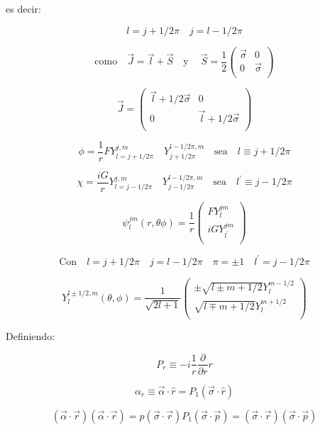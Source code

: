 \documentclass{report}
\begin{document}
es decir:

\[l = j + 1/2 \pi \quad j = l -1/2 \pi\]

\[\text{como} \quad \overrightarrow{J} = \overrightarrow{l} + \overrightarrow{S} \quad  \text{y} \ \quad \overrightarrow{S} = \frac{1}{2} \left ( \begin{array}{cc}
 \overrightarrow{\sigma} & 0 \\
 0 & \overrightarrow{\sigma} \\
 \end{array} \right) \]

\[\overrightarrow{J} = \left ( \begin{array}{cc}
 \overrightarrow{l}+1/2 \overrightarrow{\sigma} & 0 \\
 0 & \overrightarrow{l}+1/2 \overrightarrow{\sigma} \\
 \end{array} \right)\]

\[\phi = \frac{1}{r} F Y_{l=j+1/2 \pi}^{j,m} \quad Y_{j+1/2\pi}^{l-1/2\pi,m} \quad \text{sea} \quad l \equiv j+1/2 \pi\]

\[\chi = \frac{iG}{r}  Y_{l=j-1/2 \pi}^{j,m} \quad Y_{j-1/2\pi}^{l-1/2\pi,m} \quad \text{sea} \quad l^{\prime} \equiv j-1/2 \pi\]

\[\psi _{l}^{jm}(r,\theta \phi) = \frac{1}{r} \left ( \begin{array}{cc}
 F Y_{l}^{jm}  \\
 iG Y_{l^{\prime}}^{jm}   \\
 \end{array} \right)\]

\[\text{Con} \quad l = j + 1/2 \pi \quad j = l -1/2 \pi \quad \pi = \pm 1 \quad l^{\prime} = j-1/2 \pi\]

\[Y_{l}^{l \pm 1/2,m}(\theta , \phi) = \frac{1}{\sqrt{2l+1}} \left ( \begin{array}{cc}
 \pm \sqrt{l \pm m + 1/2} Y_{l}^{m-1/2}  \\
 \sqrt{l \mp m + 1/2} Y_{l}^{m+1/2}   \\
 \end{array} \right) \]

Definiendo:

\[P_{r} \equiv - i \frac{1}{r} \frac{\partial}{\partial r} r\]

\begin{equation}
\alpha_r \equiv \overrightarrow{\alpha} \cdot \hat{r} = P_1 (\overrightarrow{\sigma} \cdot \hat{r})
\end{equation}

\[(\overrightarrow{\alpha} \cdot \overrightarrow{r}) (\overrightarrow{\alpha} \cdot \overrightarrow{r}) = p (\overrightarrow{\sigma} \cdot \overrightarrow{r})P_1 (\overrightarrow{\sigma} \cdot \overrightarrow{p}) = (\overrightarrow{\sigma} \cdot \overrightarrow{r}) (\overrightarrow{\sigma} \cdot \overrightarrow{p})\]
\end{document}
